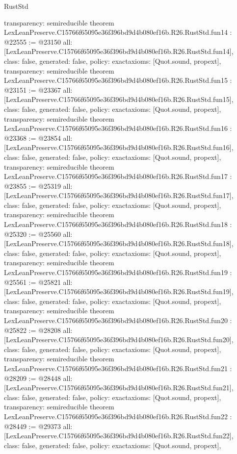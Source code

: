 \begin{lexlean}{RustStd}
\begin{coremodule}
{  transparency: semireducible
}
theorem LexLeanPreserve.C15766f65095e36f396bd9d4b080ef16b.R26.RustStd.fun14 : @22555 := @23150 {
  all: [LexLeanPreserve.C15766f65095e36f396bd9d4b080ef16b.R26.RustStd.fun14],
  class: false,
  generated: false,
  policy: exact{axioms: [Quot.sound, propext]},
  transparency: semireducible
}
theorem LexLeanPreserve.C15766f65095e36f396bd9d4b080ef16b.R26.RustStd.fun15 : @23151 := @23367 {
  all: [LexLeanPreserve.C15766f65095e36f396bd9d4b080ef16b.R26.RustStd.fun15],
  class: false,
  generated: false,
  policy: exact{axioms: [Quot.sound, propext]},
  transparency: semireducible
}
theorem LexLeanPreserve.C15766f65095e36f396bd9d4b080ef16b.R26.RustStd.fun16 : @23368 := @23854 {
  all: [LexLeanPreserve.C15766f65095e36f396bd9d4b080ef16b.R26.RustStd.fun16],
  class: false,
  generated: false,
  policy: exact{axioms: [Quot.sound, propext]},
  transparency: semireducible
}
theorem LexLeanPreserve.C15766f65095e36f396bd9d4b080ef16b.R26.RustStd.fun17 : @23855 := @25319 {
  all: [LexLeanPreserve.C15766f65095e36f396bd9d4b080ef16b.R26.RustStd.fun17],
  class: false,
  generated: false,
  policy: exact{axioms: [Quot.sound, propext]},
  transparency: semireducible
}
theorem LexLeanPreserve.C15766f65095e36f396bd9d4b080ef16b.R26.RustStd.fun18 : @25320 := @25560 {
  all: [LexLeanPreserve.C15766f65095e36f396bd9d4b080ef16b.R26.RustStd.fun18],
  class: false,
  generated: false,
  policy: exact{axioms: [Quot.sound, propext]},
  transparency: semireducible
}
theorem LexLeanPreserve.C15766f65095e36f396bd9d4b080ef16b.R26.RustStd.fun19 : @25561 := @25821 {
  all: [LexLeanPreserve.C15766f65095e36f396bd9d4b080ef16b.R26.RustStd.fun19],
  class: false,
  generated: false,
  policy: exact{axioms: [Quot.sound, propext]},
  transparency: semireducible
}
theorem LexLeanPreserve.C15766f65095e36f396bd9d4b080ef16b.R26.RustStd.fun20 : @25822 := @28208 {
  all: [LexLeanPreserve.C15766f65095e36f396bd9d4b080ef16b.R26.RustStd.fun20],
  class: false,
  generated: false,
  policy: exact{axioms: [Quot.sound, propext]},
  transparency: semireducible
}
theorem LexLeanPreserve.C15766f65095e36f396bd9d4b080ef16b.R26.RustStd.fun21 : @28209 := @28448 {
  all: [LexLeanPreserve.C15766f65095e36f396bd9d4b080ef16b.R26.RustStd.fun21],
  class: false,
  generated: false,
  policy: exact{axioms: [Quot.sound, propext]},
  transparency: semireducible
}
theorem LexLeanPreserve.C15766f65095e36f396bd9d4b080ef16b.R26.RustStd.fun22 : @28449 := @29373 {
  all: [LexLeanPreserve.C15766f65095e36f396bd9d4b080ef16b.R26.RustStd.fun22],
  class: false,
  generated: false,
  policy: exact{axioms: [Quot.sound, propext]},
}
\end{coremodule}
\end{lexlean}
